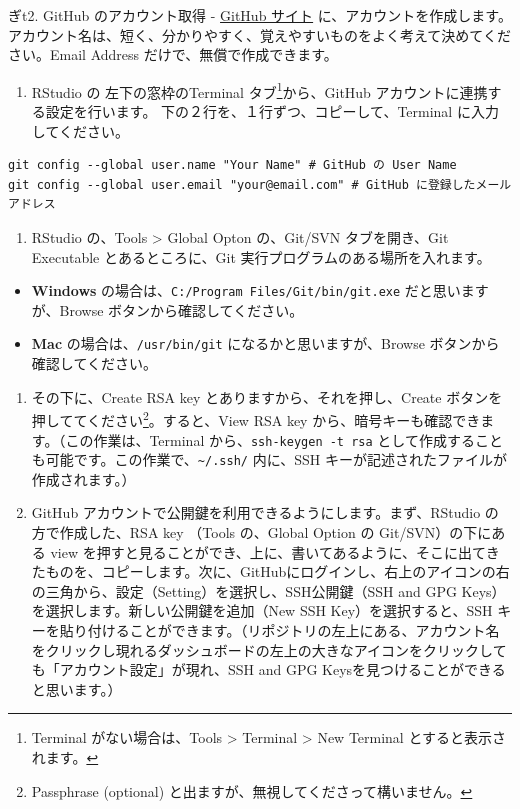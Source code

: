 \documentclass[
]{bxjsbook}
\providecommand{\tightlist}{%
  \setlength{\itemsep}{0pt}\setlength{\parskip}{0pt}}
\theoremstyle{definition}
\theoremstyle{definition}
\theoremstyle{definition}
\theoremstyle{definition}
\theoremstyle{remark}
\begin{document}
ぎt2. GitHub のアカウント取得
- \href{https://github.com}{GitHub サイト} に、アカウントを作成します。アカウント名は、短く、分かりやすく、覚えやすいものをよく考えて決めてください。Email Address だけで、無償で作成できます。

\begin{enumerate}
\def\labelenumi{\arabic{enumi}.}
\setcounter{enumi}{2}
\tightlist
\item
  RStudio の 左下の窓枠のTerminal タブ\footnote{Terminal がない場合は、Tools \textgreater{} Terminal \textgreater{} New Terminal とすると表示されます。}から、GitHub アカウントに連携する設定を行います。
  下の２行を、１行ずつ、コピーして、Terminal に入力してください。
\end{enumerate}

\begin{verbatim}
git config --global user.name "Your Name" # GitHub の User Name
git config --global user.email "your@email.com" # GitHub に登録したメールアドレス
\end{verbatim}

\begin{enumerate}
\def\labelenumi{\arabic{enumi}.}
\setcounter{enumi}{3}
\tightlist
\item
  RStudio の、Tools \textgreater{} Global Opton の、Git/SVN タブを開き、Git Executable とあるところに、Git 実行プログラムのある場所を入れます。
\end{enumerate}

\begin{itemize}
\tightlist
\item
  \textbf{Windows} の場合は、\texttt{C:/Program\ Files/Git/bin/git.exe} だと思いますが、Browse ボタンから確認してください。
\item
  \textbf{Mac} の場合は、\texttt{/usr/bin/git} になるかと思いますが、Browse ボタンから確認してください。
\end{itemize}

\begin{enumerate}
\def\labelenumi{\arabic{enumi}.}
\setcounter{enumi}{4}
\item
  その下に、Create RSA key とありますから、それを押し、Create ボタンを押しててください\footnote{Passphrase (optional) と出ますが、無視してくださって構いません。}。すると、View RSA key から、暗号キーも確認できます。（この作業は、Terminal から、\texttt{ssh-keygen\ -t\ rsa} として作成することも可能です。この作業で、\texttt{\textasciitilde{}/.ssh/} 内に、SSH キーが記述されたファイルが作成されます。）
\item
  GitHub アカウントで公開鍵を利用できるようにします。まず、RStudio の方で作成した、RSA key （Tools の、Global Option の Git/SVN）の下にある view を押すと見ることができ、上に、書いてあるように、そこに出てきたものを、コピーします。次に、GitHubにログインし、右上のアイコンの右の三角から、設定（Setting）を選択し、SSH公開鍵（SSH and GPG Keys）を選択します。新しい公開鍵を追加（New SSH Key）を選択すると、SSH キーを貼り付けることができます。（リポジトリの左上にある、アカウント名をクリックし現れるダッシュボードの左上の大きなアイコンをクリックしても「アカウント設定」が現れ、SSH and GPG Keysを見つけることができると思います。）
\end{enumerate}
\end{document}
